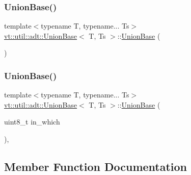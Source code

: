 \subsubsection{\texorpdfstring{Union\+Base()}{UnionBase()}\hspace{0.1cm}{\footnotesize\ttfamily [1/2]}}
{\footnotesize\ttfamily template$<$typename T, typename... Ts$>$ \\
\hyperlink{structvt_1_1util_1_1adt_1_1_union_base}{vt\+::util\+::adt\+::\+Union\+Base}$<$ T, Ts $>$\+::\hyperlink{structvt_1_1util_1_1adt_1_1_union_base}{Union\+Base} (\begin{DoxyParamCaption}{ }\end{DoxyParamCaption})\hspace{0.3cm}{\ttfamily [default]}}

\mbox{\label{structvt_1_1util_1_1adt_1_1_union_base_aa8b965b0431e03984db9000bb7b4cbf9}} 
\subsubsection{\texorpdfstring{Union\+Base()}{UnionBase()}\hspace{0.1cm}{\footnotesize\ttfamily [2/2]}}
{\footnotesize\ttfamily template$<$typename T, typename... Ts$>$ \\
\hyperlink{structvt_1_1util_1_1adt_1_1_union_base}{vt\+::util\+::adt\+::\+Union\+Base}$<$ T, Ts $>$\+::\hyperlink{structvt_1_1util_1_1adt_1_1_union_base}{Union\+Base} (\begin{DoxyParamCaption}\item[{uint8\+\_\+t}]{in\+\_\+which }\end{DoxyParamCaption})\hspace{0.3cm}{\ttfamily [inline]}, {\ttfamily [explicit]}}



\subsection{Member Function Documentation}
\mbox{\label{structvt_1_1util_1_1adt_1_1_union_base_af84a8a5eb01bc6f1ff29bab969177a83}} 
